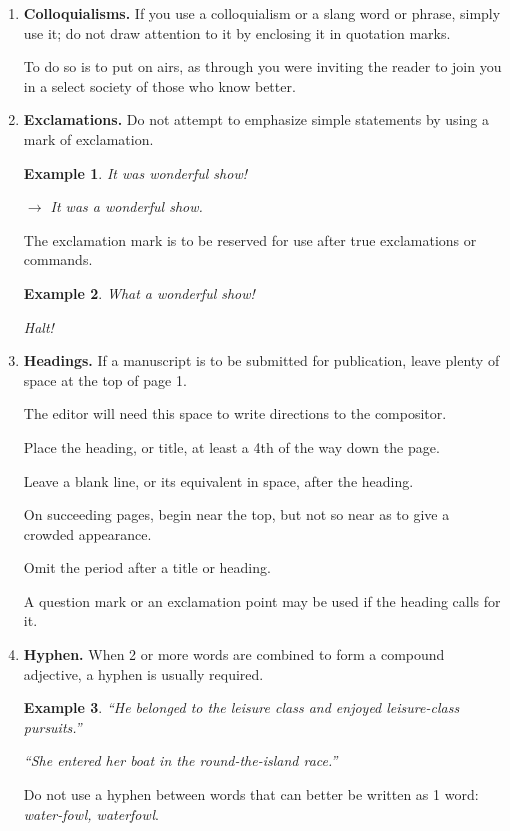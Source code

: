 \documentclass{book}
\numberwithin{equation}{section}
\newtheorem{example}{Example}[chapter]
\begin{document}
\begin{enumerate}
    \item \textbf{Colloquialisms.} If you use a colloquialism or a slang word or phrase, simply use it; do not draw attention to it by enclosing it in quotation marks.
    
    To do so is to put on airs, as through you were inviting the reader to join you in a select society of those who know better.
    \item \textbf{Exclamations.} Do not attempt to emphasize simple statements by using a mark of exclamation.
    \begin{example}
        It was wonderful show!
        
        $\to$ It was a wonderful show.
    \end{example}
    The exclamation mark is to be reserved for use after true exclamations or commands.
    \begin{example}
        What a wonderful show!
        
        Halt!
    \end{example}
    \item \textbf{Headings.} If a manuscript is to be submitted for publication, leave plenty of space at the top of page 1.
    
    The editor will need this space to write directions to the compositor.
    
    Place the heading, or title, at least a 4th of the way down the page.
    
    Leave a blank line, or its equivalent in space, after the heading.
    
    On succeeding pages, begin near the top, but not so near as to give a crowded appearance.
    
    Omit the period after a title or heading.
    
    A question mark or an exclamation point may be used if the heading calls for it.
    \item \textbf{Hyphen.} When 2 or more words are combined to form a compound adjective, a hyphen is usually required.
    \begin{example}
        ``He belonged to the leisure class and enjoyed leisure-class pursuits.''
        
        ``She entered her boat in the round-the-island race.''
    \end{example}
    Do not use a hyphen between words that can better be written as 1 word: \textit{water-fowl, waterfowl}.
    

\end{enumerate}
\end{document}
